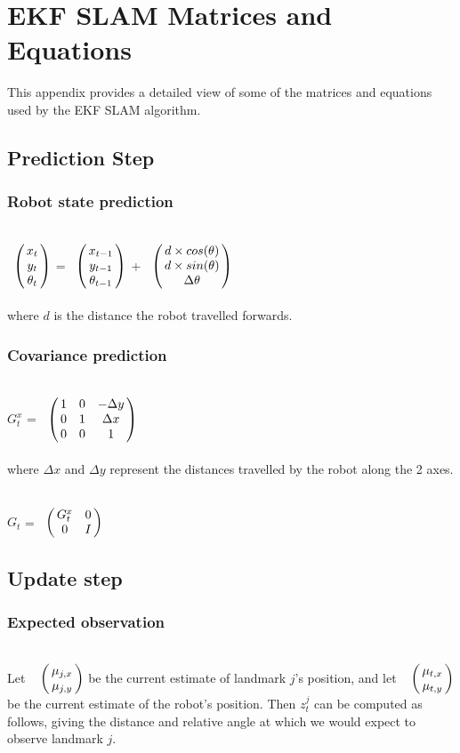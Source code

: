 \documentclass{ba-kecs}
\numberwithin{figure}{section}
\numberwithin{equation}{section}
\begin{document}
\section{EKF SLAM Matrices and Equations}
This appendix provides a detailed view of some of the matrices and equations used by the EKF SLAM algorithm.

\subsection{Prediction Step}
\subsubsection{Robot state prediction}

$\bordermatrix{ 	& \cr
                 &x_{t} \cr
                 &y_{t} \cr
                 &\theta_{t} \cr}$
=
$\bordermatrix{ 	& \cr
                 &x_{t-1} \cr
                 &y_{t-1} \cr
                 &\theta_{t-1} \cr}$
+
$\bordermatrix{ 	& \cr
                 &d \times cos(\theta) \cr
                 &d \times sin(\theta) \cr
                 &\Delta\theta \cr}$ \\ \\
where $d$ is the distance the robot travelled forwards.

\subsubsection{Covariance prediction}

$G_t^x$ = 
$\bordermatrix{ 	& \cr
                 &1 & 0 & -\Delta y \cr
                 &0 & 1 & \Delta x \cr
                 &0 & 0 & 1 \cr}$ \\ \\
where $\Delta x$ and $\Delta y$ represent the distances travelled by the robot along the 2 axes.

$G_t$ = 
$\bordermatrix{ 	& \cr
                 &G_t^x & 0 \cr
                 &0 & I \cr}$
                 
\subsection{Update step}
\subsubsection{Expected observation}
Let $\bordermatrix{~ \cr
                        & \mu_{j,x} \cr
                        & \mu_{j,y}}$
be the current estimate of landmark $j$'s position, and let $\bordermatrix{~ \cr
                        & \mu_{t,x} \cr
                        & \mu_{t,y}}$
be the current estimate of the robot's position. Then $z^j_t$ can be computed as follows, giving the distance and relative angle at which we would expect to observe landmark $j$.
                        
\end{document}
